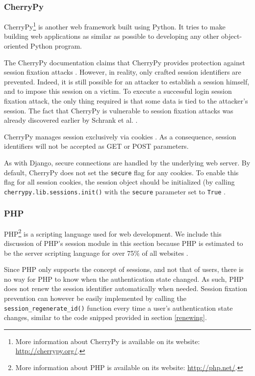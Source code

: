 \subsubsection{CherryPy}

CherryPy\footnote{More information about CherryPy is available on its website: \url{http://cherrypy.org/}.} is another web framework built using Python. It tries to make building web applications as similar as possible to developing any other object-oriented Python program.

The CherryPy documentation claims that CherryPy provides protection against session fixation attacks \cite{CherryPySessions}. However, in reality, only crafted session identifiers are prevented. Indeed, it is still possible for an attacker to establish a session himself, and to impose this session on a victim. To execute a successful login session fixation attack, the only thing required is that some data is tied to the attacker's session. The fact that CherryPy is vulnerable to session fixation attacks was already discovered earlier by Schrank et al. \cite{Schrank2010}.

CherryPy manages session exclusively via cookies \cite{CherryPySessions}. As a consequence, session identifiers will not be accepted as GET or POST parameters.

As with Django, secure connections are handled by the underlying web server. By default, CherryPy does not set the \texttt{secure} flag for any cookies. To enable this flag for all session cookies, the session object should be initialized (by calling \texttt{cherrypy.lib.sessions.init()} with the \texttt{secure} parameter set to \texttt{True} \cite{CherryPySessions}.

\subsubsection{PHP}

PHP\footnote{More information about PHP is available on its website: \url{http://php.net/}.} is a scripting language used for web development. We include this discussion of PHP's session module in this section because PHP is estimated to be the server scripting language for over 75\% of all websites \cite{ServerSurvey}.

Since PHP only supports the concept of sessions, and not that of users, there is no way for PHP to know when the authentication state changed. As such, PHP does not renew the session identifier automatically when needed. Session fixation prevention can however be easily implemented by calling the \texttt{session\_regenerate\_id()} function every time a user's authentication state changes, similar to the code snipped provided in section \ref{renewing}.

